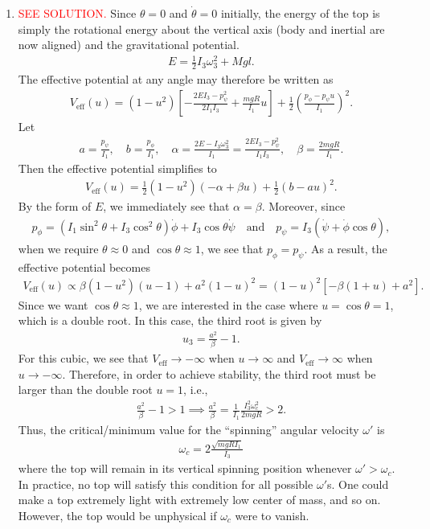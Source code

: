 \documentclass{article}
\theoremstyle{definition}
\newcommand{\al}{\alpha}
\newcommand{\be}{\beta}
\newcommand{\f}[2]{\frac{#1}{#2}}
\newcommand{\lp}{\left(}
\newcommand{\rp}{\right)}
\newcommand{\lb}{\left[}
\newcommand{\rb}{\right]}
\begin{document}
\begin{enumerate}[label=(\alph*)]
	
	\item \textcolor{red}{SEE SOLUTION.} Since $\theta = 0$ and $\dot\theta = 0$ initially, the energy of the top is simply the rotational energy about the vertical axis (body and inertial are now aligned) and the gravitational potential.
	\begin{align*}
	E = \f{1}{2}I_3 \omega_3^2 + Mgl.
	\end{align*} 
	The effective potential at any angle may therefore be written as 
	\begin{align*}
	V_\text{eff}(u) = (1-u^2)\lb -\f{2E I_3 - p_\psi^2}{2I_1 I_3} + \f{mgR}{I_1}u \rb + \f{1}{2}\lp \f{p_\phi - p_\psi u}{I_1} \rp^2.
	\end{align*}
	Let 
	\begin{align*}
	a = \f{p_\psi}{I_1}, \quad b = \f{p_\phi}{I_1}, \quad \al = \f{2E - I_3 \omega_3^2}{I_1} = \f{2E I_3 - p_\psi^2}{I_1I_3}, \quad \be = \f{2mgR}{I_1}.
	\end{align*}
	Then the effective potential simplifies to 
	\begin{align*}
	V_\text{eff}(u) = \f{1}{2}(1-u^2)( -\al + \be u ) + \f{1}{2}(b - au)^2.
	\end{align*}
	By the form of $E$, we immediately see that $\al = \be$. Moreover, since 
	\begin{align*}
	p_\phi = (I_1\sin^2\theta + I_3\cos^2\theta)\dot\phi + I_3\cos\theta\dot\psi \quad \text{and}\quad
	p_\psi = I_3(\dot\psi + \dot\phi \cos\theta),
	\end{align*}
	when we require $\theta \approx 0$ and $\cos\theta \approx 1$, we see that $p_\phi = p_\psi$. As a result, the effective potential becomes
	\begin{align*}
	V_\text{eff}(u) \propto \be(1-u^2)(u-1) + a^2(1-u)^2 = (1-u)^2 \lb -\be(1+u) + a^2 \rb.
	\end{align*} 
	Since we want $\cos\theta\approx 1$, we are interested in the case where $u=\cos\theta = 1$, which is a double root. In this case, the third root is given by 
	\begin{align*}
	u_3 = \f{a^2}{\be} - 1.
	\end{align*}
	For this cubic, we see that $V_\text{eff}\to -\infty$ when $u\to \infty$ and $V_\text{eff}\to \infty$ when $u\to -\infty$. Therefore, in order to achieve stability, the third root must be larger than the double root $u=1$, i.e., 
	\begin{align*}
	\f{a^2}{\be} - 1 > 1 \implies \f{a^2}{\be} = \f{1}{I_1} \f{I_3^2 \omega_c^2}{2mgR} > 2.
	\end{align*} 
	Thus, the critical/minimum value for the ``spinning'' angular velocity $\omega'$ is  
	\begin{align*}
	\boxed{\omega_c = 2{\f{\sqrt{mgR I_1}}{I_3}}}
	\end{align*}
	where the top will remain in its vertical spinning position whenever $\omega' > \omega_c$. In practice, no top will satisfy this condition for all possible $\omega'$s. One could make a top extremely light with extremely low center of mass, and so on. However, the top would be unphysical if $\omega_c$ were to vanish.  
\end{enumerate}
\end{document}
